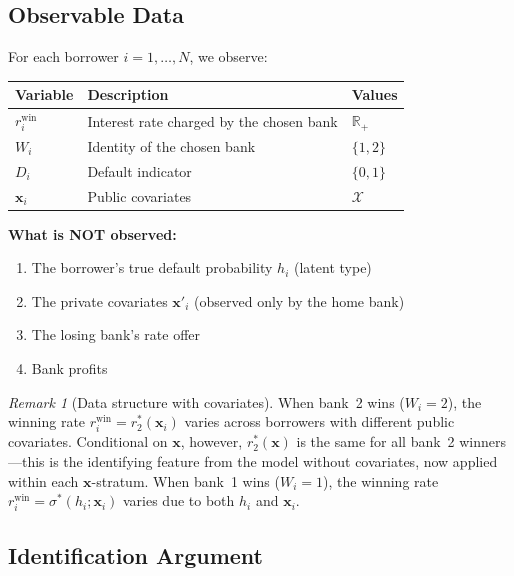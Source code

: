 \documentclass[12pt]{article}
\theoremstyle{plain}
\theoremstyle{plain}
\theoremstyle{definition}  %
\theoremstyle{remark}  %
\newtheorem{remark}[thm]{Remark}  %
\begin{document}
\subsection{Observable Data}\label{sec:data}

For each borrower $i = 1, \ldots, N$, we observe:
\begin{center}
\renewcommand{\arraystretch}{1.3}
\begin{tabular}{lll}
\toprule
\textbf{Variable} & \textbf{Description} & \textbf{Values} \\
\midrule
$r_i^{\text{win}}$ & Interest rate charged by the chosen bank & $\mathbb{R}_+$ \\
$W_i$ & Identity of the chosen bank & $\{1, 2\}$ \\
$D_i$ & Default indicator & $\{0, 1\}$ \\
$\mathbf{x}_i$ & Public covariates & $\mathcal{X}$ \\
\bottomrule
\end{tabular}
\end{center}

\medskip\noindent
\textbf{What is NOT observed:}
\begin{enumerate}
    \item The borrower's true default probability $h_i$ (latent type)
    \item The private covariates $\mathbf{x}'_i$ (observed only by the home bank)
    \item The losing bank's rate offer
    \item Bank profits
\end{enumerate}

\begin{remark}[Data structure with covariates]\label{rem:data_x}
When bank~2 wins ($W_i = 2$), the winning rate $r_i^{\text{win}} = r_2^*(\mathbf{x}_i)$ varies across borrowers with different public covariates. Conditional on $\mathbf{x}$, however, $r_2^*(\mathbf{x})$ is the same for all bank~2 winners---this is the identifying feature from the model without covariates, now applied within each $\mathbf{x}$-stratum. When bank~1 wins ($W_i = 1$), the winning rate $r_i^{\text{win}} = \sigma^*(h_i; \mathbf{x}_i)$ varies due to both $h_i$ and $\mathbf{x}_i$.
\end{remark}


\subsection{Identification Argument}\label{sec:id_arg}
\end{document}
